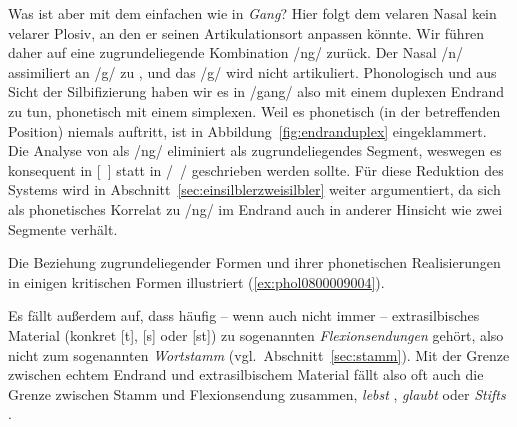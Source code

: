 Was ist aber mit dem einfachen \textipa{[N]} wie in \textit{Gang}?
Hier folgt dem velaren Nasal kein velarer Plosiv, an den er seinen Artikulationsort anpassen könnte.
Wir führen \textipa{[N]} daher auf eine zugrundeliegende Kombination /ng/ zurück.
Der Nasal /n/ assimiliert an /g/ zu \textipa{[N]}, und das /g/ wird nicht artikuliert.
Phonologisch und aus Sicht der Silbifizierung haben wir es \zB in /gang/ also mit einem duplexen Endrand zu tun, phonetisch mit einem simplexen.
Weil es phonetisch (in der betreffenden Position) niemals auftritt, ist \textipa{[g]} in Abbildung~\ref{fig:endranduplex} eingeklammert.
Die Analyse von \textipa{[N]} als /ng/ eliminiert \textipa{[N]} als zugrundeliegendes Segment, weswegen es konsequent in [~] statt in /~/ geschrieben werden sollte.
Für diese Reduktion des Systems wird in Abschnitt~\ref{sec:einsilblerzweisilbler} weiter argumentiert, da sich \textipa{[N]} als phonetisches Korrelat zu /ng/ im Endrand auch in anderer Hinsicht wie zwei Segmente verhält.

Die Beziehung zugrundeliegender Formen und ihrer phonetischen Realisierungen in einigen kritischen Formen illustriert (\ref{ex:phol0800009004}).

\begin{exe}
  \ex \label{ex:phol0800009004}
  \begin{xlist}
  \end{xlist}
\end{exe}

Es fällt außerdem auf, dass häufig -- wenn auch nicht immer -- extrasilbisches Material (konkret [t], [s] oder [st]) zu sogenannten \textit{Flexionsendungen} gehört, also nicht zum sogenannten \textit{Wortstamm} (vgl.\ Abschnitt~\ref{sec:stamm}).
Mit der Grenze zwischen echtem Endrand und extrasilbischem Material fällt also oft auch die Grenze zwischen Stamm und Flexionsendung zusammen, \zB \textit{lebst} \textipa{[le:p+st]}, \textit{glaubt} \textipa{[gl\t{aO}p+t]} oder \textit{Stifts} \textipa{[StIft+s]}.


